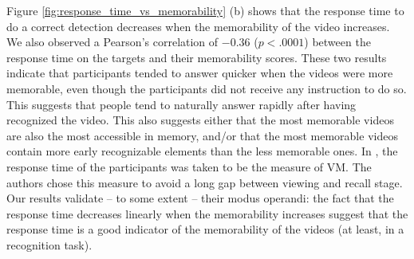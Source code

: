 \documentclass[sigconf]{acmart}
\begin{document}
Figure \ref{fig:response_time_vs_memorability} (b) shows that the response time to do a correct detection decreases when the memorability of the video increases.
We also observed a Pearson's correlation of $-0.36$ ($p<.0001$) between the response time on the targets and their memorability scores.
These two results indicate that participants tended to answer quicker when the videos were more memorable, even though the participants did not receive any instruction to do so.
This suggests that people tend to naturally answer rapidly after having recognized the video.
This also suggests either that the most memorable videos are also the most accessible in memory, and/or that the most memorable videos contain more early recognizable elements than the less memorable ones.
In \cite{shekhar_2017_show}, the response time of the participants was taken to be the measure of VM.
The authors chose this measure to avoid a long gap between viewing and recall stage.
Our results validate -- to some extent -- their modus operandi: the fact that the response time decreases linearly when the memorability increases suggest that the response time is a good indicator of the memorability of the videos (at least, in a recognition task). 
\end{document}
